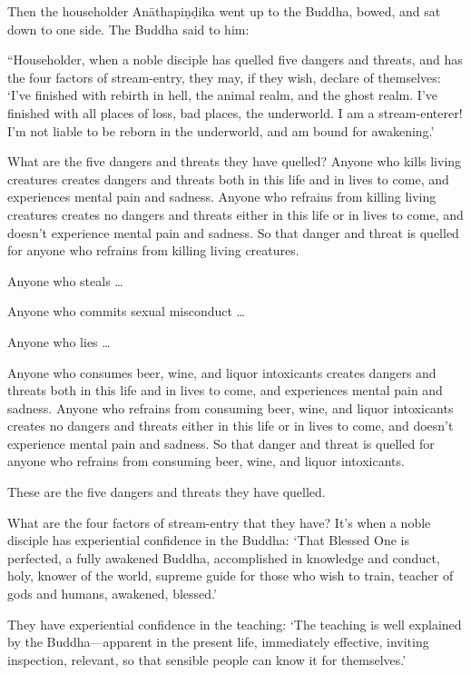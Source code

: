 \documentclass[12pt,openany]{book}%
\begin{document}
Then the householder \textsanskrit{Anāthapiṇḍika} went up to the Buddha, bowed, and sat down to one side. The Buddha said to him: 

“Householder, when a noble disciple has quelled five dangers and threats, and has the four factors of stream-entry, they may, if they wish, declare of themselves: ‘I’ve finished with rebirth in hell, the animal realm, and the ghost realm. I’ve finished with all places of loss, bad places, the underworld. I am a stream-enterer! I’m not liable to be reborn in the underworld, and am bound for awakening.’ 

What are the five dangers and threats they have quelled? Anyone who kills living creatures creates dangers and threats both in this life and in lives to come, and experiences mental pain and sadness. Anyone who refrains from killing living creatures creates no dangers and threats either in this life or in lives to come, and doesn’t experience mental pain and sadness. So that danger and threat is quelled for anyone who refrains from killing living creatures. 

Anyone who steals … 

Anyone who commits sexual misconduct … 

Anyone who lies … 

Anyone who consumes beer, wine, and liquor intoxicants creates dangers and threats both in this life and in lives to come, and experiences mental pain and sadness. Anyone who refrains from consuming beer, wine, and liquor intoxicants creates no dangers and threats either in this life or in lives to come, and doesn’t experience mental pain and sadness. So that danger and threat is quelled for anyone who refrains from consuming beer, wine, and liquor intoxicants. 

These are the five dangers and threats they have quelled. 

What are the four factors of stream-entry that they have? It’s when a noble disciple has experiential confidence in the Buddha: ‘That Blessed One is perfected, a fully awakened Buddha, accomplished in knowledge and conduct, holy, knower of the world, supreme guide for those who wish to train, teacher of gods and humans, awakened, blessed.’ 

They have experiential confidence in the teaching: ‘The teaching is well explained by the Buddha—apparent in the present life, immediately effective, inviting inspection, relevant, so that sensible people can know it for themselves.’ 
\end{document}
